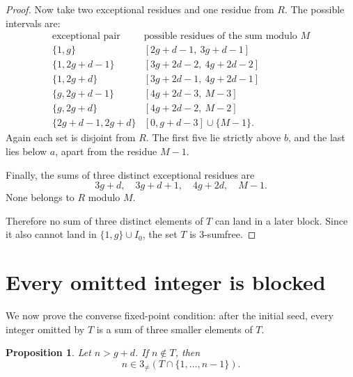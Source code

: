 \documentclass[11pt]{article}
\newtheorem{proposition}[theorem]{Proposition}
\begin{document}
\begin{proof}
Now take two exceptional residues and one residue from \(R\). The possible intervals are:
\[
\begin{array}{c|c}
\text{exceptional pair} & \text{possible residues of the sum modulo }M\\ \hline
\{1,g\} & [2g+d-1,\ 3g+d-1]\\
\{1,2g+d-1\} & [3g+2d-2,\ 4g+2d-2]\\
\{1,2g+d\} & [3g+2d-1,\ 4g+2d-1]\\
\{g,2g+d-1\} & [4g+2d-3,\ M-3]\\
\{g,2g+d\} & [4g+2d-2,\ M-2]\\
\{2g+d-1,2g+d\} & [0,g+d-3]\cup\{M-1\}.
\end{array}
\]
Again each set is disjoint from \(R\). The first five lie strictly above \(b\), and the last lies below \(a\), apart from the residue \(M-1\).

Finally, the sums of three distinct exceptional residues are
\[
3g+d,\quad 3g+d+1,\quad 4g+2d,\quad M-1.
\]
None belongs to \(R\) modulo \(M\).

Therefore no sum of three distinct elements of \(T\) can land in a later block. Since it also cannot land in \(\{1,g\}\cup I_0\), the set \(T\) is 3-sumfree.
\end{proof}

\section{Every omitted integer is blocked}

We now prove the converse fixed-point condition: after the initial seed, every integer omitted by \(T\) is a sum of three smaller elements of \(T\).

\begin{proposition}
Let \(n>g+d\). If \(n\notin T\), then
\[
n\in 3_{\neq}(T\cap\{1,\ldots,n-1\}).
\]
\end{proposition}
\end{document}
